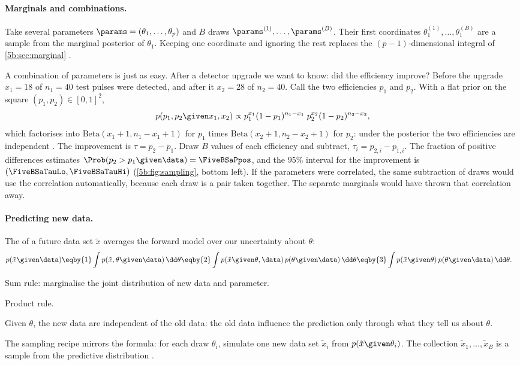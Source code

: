 \paragraph{Marginals and combinations.} Take several parameters $\params=(\theta_1,\dots,
\theta_p)$ and $B$ draws $\params^{(1)},\dots,\params^{(B)}$. Their first coordinates
$\theta_1^{(1)},\dots,\theta_1^{(B)}$ are a sample from the marginal posterior of
$\theta_1$. Keeping one coordinate and ignoring the rest replaces the $(p-1)$-dimensional
integral of \cref{5b:sec:marginal} .

A combination of parameters is just as easy. After a detector upgrade we want to know:
did the efficiency improve? Before the upgrade $x_1=18$ of $n_1=40$ test pulses were
detected, and after it $x_2=28$ of $n_2=40$. Call the two efficiencies $p_1$ and $p_2$.
With a flat prior on the square $(p_1,p_2)\in[0,1]^2$,
\begin{equation*}
  p(p_1,p_2\given x_1,x_2)\propto p_1^{x_1}(1-p_1)^{n_1-x_1}\;p_2^{x_2}(1-p_2)^{n_2-x_2},
\end{equation*}
which factorises into $\mathrm{Beta}(x_1+1,n_1-x_1+1)$ for $p_1$ times
$\mathrm{Beta}(x_2+1,n_2-x_2+1)$ for $p_2$: under the posterior the two efficiencies are
independent . The improvement is $\tau=p_2-p_1$. Draw
$B$ values of each efficiency and subtract, $\tau_i=p_{2,i}-p_{1,i}$. The fraction of
positive differences estimates $\Prob(p_2>p_1\given\data)=\FiveBSaPpos$, and the 95\%
interval for the improvement is $(\FiveBSaTauLo,\FiveBSaTauHi)$ (\cref{5b:fig:sampling},
bottom left). If the parameters were correlated, the same subtraction of draws would use
the correlation automatically, because each draw is a pair taken together. The separate
marginals would have thrown that correlation away.

\paragraph{Predicting new data.} The  of a
future data set $\tilde x$ averages the forward model over our uncertainty about $\theta$:
\begin{align*}
  p(\tilde x\given\data)
  &\eqby{1}\int p(\tilde x,\theta\given\data)\,\dd\theta
   \eqby{2}\int p(\tilde x\given\theta,\data)\,p(\theta\given\data)\,\dd\theta
   \eqby{3}\int p(\tilde x\given\theta)\,p(\theta\given\data)\,\dd\theta .
\end{align*}
\begin{explain}
  \item Sum rule: marginalise the joint distribution of new data and parameter.
  \item Product rule.
  \item Given $\theta$, the new data are independent of the old data: the old data
        influence the prediction only through what they tell us about $\theta$.
\end{explain}
The sampling recipe mirrors the formula: for each draw $\theta_i$, simulate one new data
set $\tilde x_i$ from $p(\tilde x\given\theta_i)$. The collection $\tilde x_1,\dots,
\tilde x_B$ is a sample from the predictive distribution .

